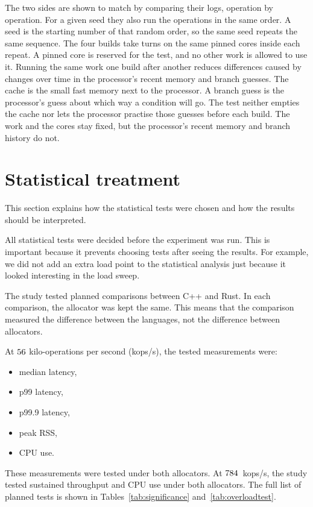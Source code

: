 \documentclass[english,oneside,a4paper,censored,csm,software-track-2020]{HYthesisML}
\begin{document}
The two sides are shown to match by comparing their logs, operation by
operation. For a given seed they also run the operations in the same order.
A seed is the starting number of that random order, so the same seed repeats
the same sequence. The four builds take turns on the same pinned cores
inside each repeat. A pinned core is reserved for the test, and no other work
is allowed to use it. Running the same work one build after another reduces
differences caused by changes over time in the processor's recent memory and
branch guesses. The cache is the small fast memory next to the processor. A
branch guess is the processor's guess about which way a condition will go.
The test neither empties the cache nor lets the processor practise those
guesses before each build. The work and the cores stay fixed, but the
processor's recent memory and branch history do not.

\section{Statistical treatment}\label{sec:statsbrief}
This section explains how the statistical tests were chosen and how the results should
be interpreted.

All statistical tests were decided before the experiment was run. This is important
because it prevents choosing tests after seeing the results. For example, we did not add
an extra load point to the statistical analysis just because it looked interesting in the
load sweep.

The study tested \NTests{} planned comparisons between C++ and Rust. In each comparison,
the allocator was kept the same. This means that the comparison measured the difference
between the languages, not the difference between allocators.

At $56$ kilo-operations per second (kops/s), the tested measurements were:

\begin{itemize}
  \item median latency,
  \item p99 latency,
  \item p99.9 latency,
  \item peak RSS,
  \item CPU use.
\end{itemize}

These measurements were tested under both allocators. At $784$~kops/s, the
study tested sustained throughput and CPU use under both allocators. The full list of
planned tests is shown in Tables~\ref{tab:significance} and~\ref{tab:overloadtest}.
\end{document}
